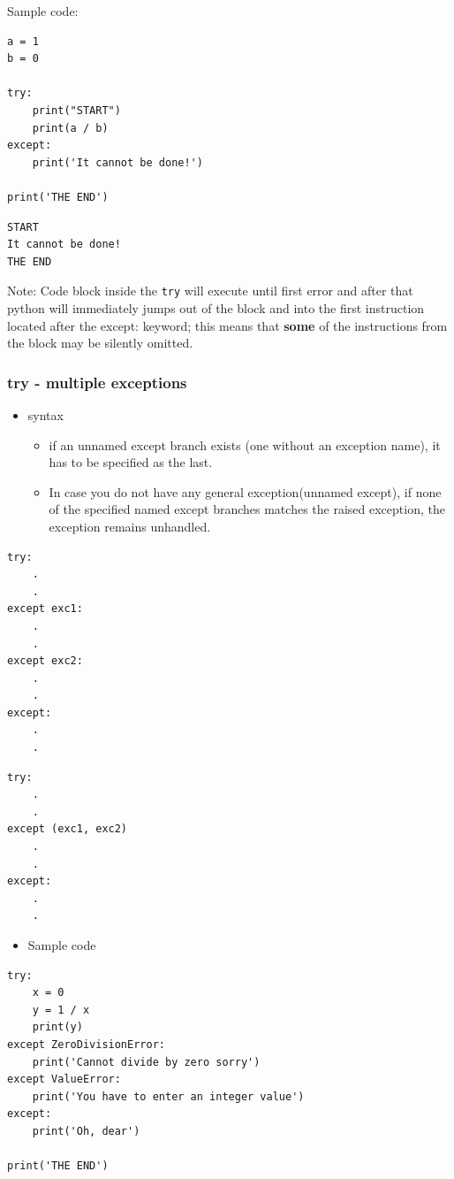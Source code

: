 \documentclass[11pt]{article}
\begin{document}
Sample code:
\begin{verbatim}
a = 1
b = 0

try:
    print("START")
    print(a / b)
except:
    print('It cannot be done!')

print('THE END')

\end{verbatim}

\begin{verbatim}
START
It cannot be done!
THE END
\end{verbatim}

Note: Code block inside the \texttt{try} will execute until first error and
after that python will immediately jumps out of the block and into the
first instruction located after the except: keyword; this means that
\textbf{some} of the instructions from the block may be silently omitted.

\subsubsection{try - multiple exceptions}
\label{sec:orgf45905d}
\begin{itemize}
\item syntax
\begin{itemize}
\item if an unnamed except branch exists (one without an exception
name), it has to be specified as the last.
\item In case you do not have any general exception(unnamed except), if
none of the specified named except branches matches the raised
exception, the exception remains unhandled.
\end{itemize}
\end{itemize}

\begin{verbatim}
try:
    .
    .
except exc1:
    .
    .
except exc2:
    .
    .
except:
    .
    .
\end{verbatim}

\begin{verbatim}
try:
    .
    .
except (exc1, exc2)
    .
    .
except:
    .
    .
\end{verbatim}

\begin{itemize}
\item Sample code
\end{itemize}
\begin{verbatim}
try:
    x = 0
    y = 1 / x
    print(y)
except ZeroDivisionError:
    print('Cannot divide by zero sorry')
except ValueError:
    print('You have to enter an integer value')
except:
    print('Oh, dear')

print('THE END')
\end{verbatim}
\end{document}
